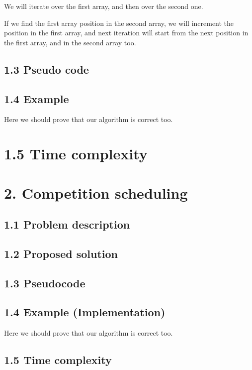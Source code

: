 \documentclass{article}
\begin{document}
We will iterate over the first array, and then over the second one.

If we find the first array position in the second array, we will increment the position in the first array, and next iteration will start from the next position in the first array, and in the second array too.

\subsection*{1.3 Pseudo code}

\subsection*{1.4 Example}

Here we should prove that our algorithm is correct too.

\section*{1.5 Time complexity}

\section*{2. Competition scheduling}

\subsection*{1.1 Problem description}

\subsection*{1.2 Proposed solution}

\subsection*{1.3 Pseudocode}

\subsection*{1.4 Example (Implementation)}

Here we should prove that our algorithm is correct too.

\subsection*{1.5 Time complexity}
\end{document}
